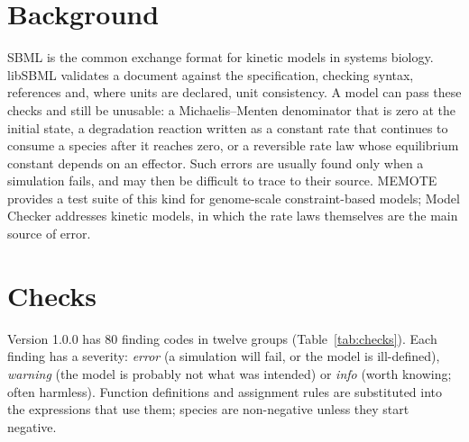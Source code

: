 \documentclass[10pt]{article}
\begin{document}
\section{Background}
SBML \cite{hucka2003sbml} is the common exchange format for kinetic models in systems biology. libSBML
\cite{bornstein2008libsbml} validates a document against the specification, checking syntax, references
and, where units are declared, unit consistency. A model can pass these checks and still be unusable: a
Michaelis--Menten denominator that is zero at the initial state, a degradation reaction written as a
constant rate that continues to consume a species after it reaches zero, or a reversible rate law whose
equilibrium constant depends on an effector. Such errors are usually found only when a simulation fails, and may then be
difficult to trace to their source. MEMOTE
\cite{lieven2020memote} provides a test suite of this kind for genome-scale constraint-based models; Model
Checker addresses kinetic models, in which the rate laws themselves are the main source of error.

\section{Checks}
Version 1.0.0 has 80 finding codes in twelve groups (Table~\ref{tab:checks}). Each finding has a severity:
\emph{error} (a simulation will fail, or the model is ill-defined), \emph{warning} (the model is probably not
what was intended) or \emph{info} (worth knowing; often harmless). Function definitions and assignment rules
are substituted into the expressions that use them; species are non-negative unless they start negative.
\end{document}
